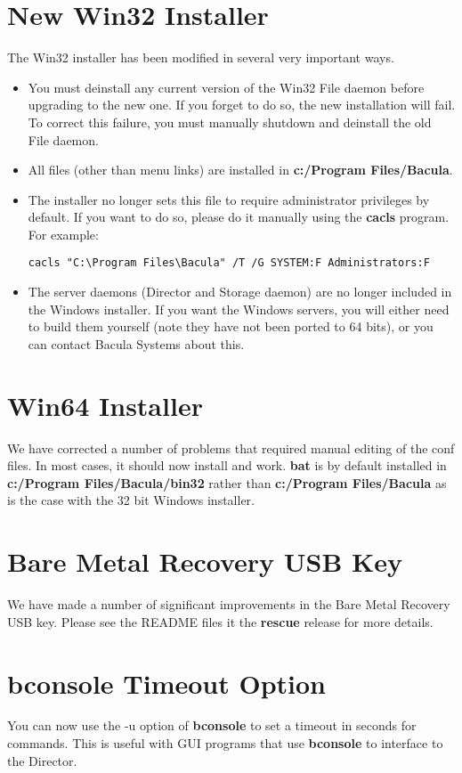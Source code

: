 \section{New Win32 Installer}
The Win32 installer has been modified in several very important
ways.  
\begin{itemize}
\item You must deinstall any current version of the
Win32 File daemon before upgrading to the new one. 
If you forget to do so, the new installation will fail.
To correct this failure, you must manually shutdown 
and deinstall the old File daemon. 
\item All files (other than menu links) are installed
in {\bf c:/Program Files/Bacula}.  
\item The installer no longer sets this
file to require administrator privileges by default. If you want
to do so, please do it manually using the {\bf cacls} program.
For example:
\begin{verbatim}
cacls "C:\Program Files\Bacula" /T /G SYSTEM:F Administrators:F
\end{verbatim}
\item The server daemons (Director and Storage daemon) are
no longer included in the Windows installer.  If you want the
Windows servers, you will either need to build them yourself (note
they have not been ported to 64 bits), or you can contact 
Bacula Systems about this.
\end{itemize}

\section{Win64 Installer}
We have corrected a number of problems that required manual
editing of the conf files.  In most cases, it should now
install and work.  {\bf bat} is by default installed in
{\bf c:/Program Files/Bacula/bin32} rather than
{\bf c:/Program Files/Bacula} as is the case with the 32
bit Windows installer.

\section{Bare Metal Recovery USB Key}
We have made a number of significant improvements in the
Bare Metal Recovery USB key.  Please see the README files
it the {\bf rescue} release for more details.



\section{bconsole Timeout Option}
You can now use the -u option of {\bf bconsole} to set a timeout in seconds
for commands. This is useful with GUI programs that use {\bf bconsole}
to interface to the Director.

